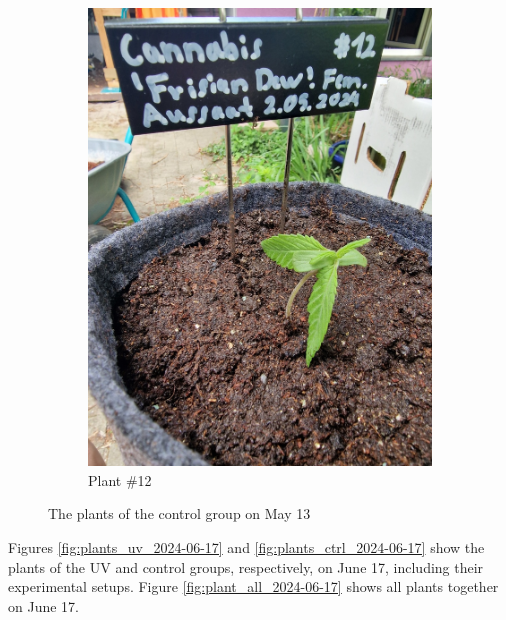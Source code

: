 \begin{figure}[H]
\begin{subfigure}[t]{.19\textwidth}
        \includegraphics[width=\linewidth]{plant_12_2024-05-13}
        \caption{Plant \#12}
        \label{fig:plant_12_2024-05-13}
    \end{subfigure}
    \caption[Plants of the control group on May 13]{The plants of the control group on May 13}
    \label{fig:plants_ctrl_2024-05-13}
\end{figure}

Figures \ref{fig:plants_uv_2024-06-17} and \ref{fig:plants_ctrl_2024-06-17} show the plants of the UV and control groups, respectively, on June 17, including their experimental setups. Figure \ref{fig:plant_all_2024-06-17} shows all plants together on June 17.

